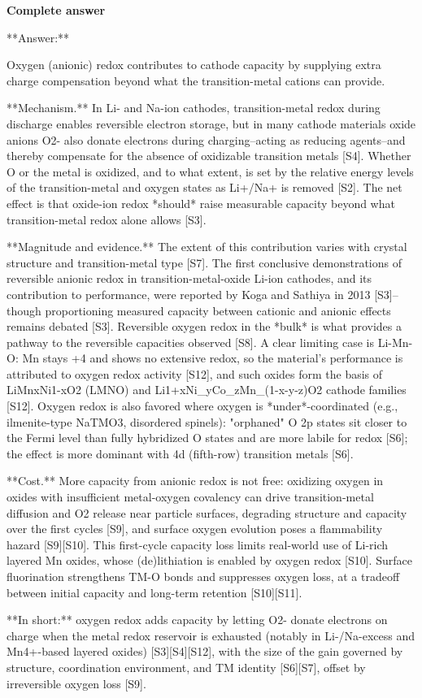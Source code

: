 \documentclass[10pt]{article}
\begin{document}
\textbf{Complete answer}
\begin{AnswerText}
**Answer:**

Oxygen (anionic) redox contributes to cathode capacity by supplying extra charge compensation beyond what the transition-metal cations can provide.

**Mechanism.** In Li- and Na-ion cathodes, transition-metal redox during discharge enables reversible electron storage, but in many cathode materials oxide anions O2- also donate electrons during charging--acting as reducing agents--and thereby compensate for the absence of oxidizable transition metals [S4]. Whether O or the metal is oxidized, and to what extent, is set by the relative energy levels of the transition-metal and oxygen states as Li+/Na+ is removed [S2]. The net effect is that oxide-ion redox *should* raise measurable capacity beyond what transition-metal redox alone allows [S3].

**Magnitude and evidence.** The extent of this contribution varies with crystal structure and transition-metal type [S7]. The first conclusive demonstrations of reversible anionic redox in transition-metal-oxide Li-ion cathodes, and its contribution to performance, were reported by Koga and Sathiya in 2013 [S3]--though proportioning measured capacity between cationic and anionic effects remains debated [S3]. Reversible oxygen redox in the *bulk* is what provides a pathway to the reversible capacities observed [S8]. A clear limiting case is Li-Mn-O: Mn stays +4 and shows no extensive redox, so the material's performance is attributed to oxygen redox activity [S12], and such oxides form the basis of LiMnxNi1-xO2 (LMNO) and Li1+xNi_yCo_zMn_(1-x-y-z)O2 cathode families [S12]. Oxygen redox is also favored where oxygen is *under*-coordinated (e.g., ilmenite-type NaTMO3, disordered spinels): "orphaned" O 2p states sit closer to the Fermi level than fully hybridized O states and are more labile for redox [S6]; the effect is more dominant with 4d (fifth-row) transition metals [S6].

**Cost.** More capacity from anionic redox is not free: oxidizing oxygen in oxides with insufficient metal-oxygen covalency can drive transition-metal diffusion and O2 release near particle surfaces, degrading structure and capacity over the first cycles [S9], and surface oxygen evolution poses a flammability hazard [S9][S10]. This first-cycle capacity loss limits real-world use of Li-rich layered Mn oxides, whose (de)lithiation is enabled by oxygen redox [S10]. Surface fluorination strengthens TM-O bonds and suppresses oxygen loss, at a tradeoff between initial capacity and long-term retention [S10][S11].

**In short:** oxygen redox adds capacity by letting O2- donate electrons on charge when the metal redox reservoir is exhausted (notably in Li-/Na-excess and Mn4+-based layered oxides) [S3][S4][S12], with the size of the gain governed by structure, coordination environment, and TM identity [S6][S7], offset by irreversible oxygen loss [S9].
\end{AnswerText}
\end{document}

